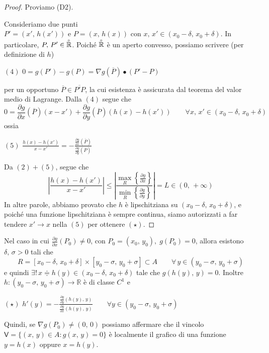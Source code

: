 \begin{proof}
Proviamo (D2).

Consideriamo due punti $P' = (x',\,h(x')) \text{ e } P = (x,\,h(x)) \text{ con } x,\,x' \in (x_0-\delta,\, x_0+\delta)$. In particolare, $P,\,P' \in \overset{\null_\circ}{\mathbb{R}}$. Poiché $\overset{\null_\circ}{\mathbb{R}}$ è un aperto convesso, possiamo scrivere (per definizione di $h$)
\begin{center}
$\mathrm{(4)}$
\hfill
$\displaystyle
0 = g(P') - g(P) = \nabla g(\overline{P}) \bullet (P' - P)
$
\hfill \null \\
\end{center}
per un opportuno $\overline{P} \in \overline{P'P}$, la cui esistenza è assicurata dal teorema del valor medio di Lagrange. Dalla $\mathrm{(4)}$ segue che
$$
0 = \frac{\partial g}{\partial x}(\overline{P})(x-x') + \frac{\partial g}{\partial y}(\overline{P})(h(x)-h(x')) \qquad \forall x,\,x' \in (x_0-\delta,\, x_0+\delta)
$$
ossia
\begin{center}
$\mathrm{(5)}$
\hfill
$\displaystyle
\frac{h(x)-h(x')}{x-x'} = - \frac{\displaystyle \frac{\partial g}{\partial x}(\overline{P})}{\displaystyle \frac{\partial g}{\partial y}(\overline{P})}
$
\hfill \null \\
\end{center}
Da $\mathrm{(2)}+\mathrm{(5)}$, segue che
$$
\left\lvert \frac{h(x)-h(x')}{x-x'} \right\rvert \leq \left\lvert \frac{\displaystyle \underset{R}{\max} \left\lbrace \frac{\partial g}{\partial x} \right\rbrace}{\displaystyle \underset{R}{\min} \left\lbrace \frac{\partial g}{\partial y} \right\rbrace} \right\rvert = L \in (0,\,+\infty)
$$
In altre parole, abbiamo provato che $h$ è lipschitziana su $(x_0-\delta,\, x_0+\delta)$, e poiché una funzione lipschitziana è sempre continua, siamo autorizzati a far tendere $x' \rightarrow x$ nella $\mathrm{(5)}$ per ottenere $\mathrm{(\star)}$.
\end{proof}

\begin{obs}[i]
Nel caso in cui $\frac{\partial g}{\partial x}(P_0) \neq 0$, con $P_0 = (x_0,\,y_0), \; g(P_0) = 0$, allora esistono $\delta,\,\sigma > 0$ tali che
$$
R = [x_0 - \delta,\, x_0 + \delta] \times [y_0 - \sigma,\, y_0 + \sigma] \subset A \qquad \forall \, y \in (y_0-\sigma,\,y_0+\sigma)
$$
e quindi $\exists ! \, x \doteqdot h(y) \in (x_0-\delta,\,x_0+\delta)$ tale che $g(h(y),\,y) = 0$. Inoltre $h : (y_0 - \sigma,\, y_0 + \sigma) \longrightarrow \mathbb{R}$ è di classe $C^1$ e
\begin{center}
$\mathrm{(\star)}$
\hfill
$\displaystyle
h'(y) = - \frac{\displaystyle \frac{\partial g}{\partial y} \left( h(y),\,y \right)}{\displaystyle \frac{\partial g}{\partial x} \left( h(y),\,y \right)}
\qquad \forall y \in (y_0 - \sigma,\, y_0 + \sigma)
$
\hfill \null \\
\end{center}
Quindi, se $\nabla g(P_0) \neq (0,\,0)$ possiamo affermare che il vincolo $\mathsf{V} = \lbrace (x,\,y) \in A : g(x,\,y) = 0 \rbrace$ è localmente il grafico di una funzione $y = h(x)$ oppure $x=h(y)$.
\end{obs}

